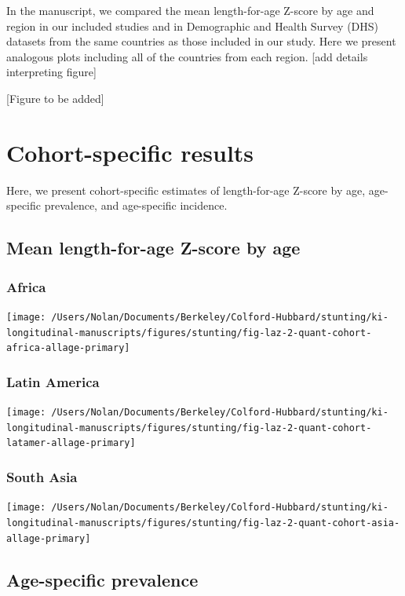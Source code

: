 \documentclass[9pt,]{book}
\begin{document}
\raggedright

In the manuscript, we compared the mean length-for-age Z-score by age
and region in our included studies and in Demographic and Health Survey
(DHS) datasets from the same countries as those included in our study.
Here we present analogous plots including all of the countries from each
region. {[}add details interpreting figure{]}

{[}Figure to be added{]}

\chapter{Cohort-specific results}\label{cohort}

\raggedright

Here, we present cohort-specific estimates of length-for-age Z-score by
age, age-specific prevalence, and age-specific incidence.

\section{Mean length-for-age Z-score by
age}\label{mean-length-for-age-z-score-by-age}

\subsection{Africa}\label{africa}

\texttt{[image: /Users/Nolan/Documents/Berkeley/Colford-Hubbard/stunting/ki-longitudinal-manuscripts/figures/stunting/fig-laz-2-quant-cohort-africa-allage-primary]}

\subsection{Latin America}\label{latin-america}

\texttt{[image: /Users/Nolan/Documents/Berkeley/Colford-Hubbard/stunting/ki-longitudinal-manuscripts/figures/stunting/fig-laz-2-quant-cohort-latamer-allage-primary]}

\subsection{South Asia}\label{south-asia}

\texttt{[image: /Users/Nolan/Documents/Berkeley/Colford-Hubbard/stunting/ki-longitudinal-manuscripts/figures/stunting/fig-laz-2-quant-cohort-asia-allage-primary]}

\section{Age-specific prevalence}\label{age-specific-prevalence}
\end{document}
